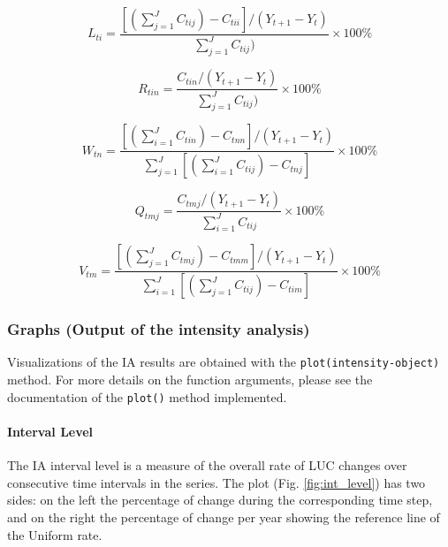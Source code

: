 \begin{equation} \label{eq:lti}
L_{ti} = \frac{\left[\left( \sum_{j=1}^{J} C_{tij} \right) - C_{tii}   \right] / (Y_{t+1} - Y_t)}{\sum_{j=1}^{J} C_{tij})} \times 100\%
\end{equation}

\begin{equation} \label{eq:rtin}
R_{tin} = \frac{C_{tin} / (Y_{t+1} - Y_t)}{\sum_{j=1}^{J} C_{tij})} \times 100\%
\end{equation}

\begin{equation} \label{eq:wtn}
W_{tn} = \frac{\left[\left( \sum_{i=1}^{J} C_{tin} \right) - C_{tnn}   \right] / (Y_{t+1} - Y_t)}{\sum_{j=1}^{J}  \left[\left( \sum_{i=1}^{J} C_{tij} \right) - C_{tnj}   \right]} \times 100\%
\end{equation}

\begin{equation} \label{eq:qtmj}
Q_{tmj} = \frac{C_{tmj} / (Y_{t+1} - Y_t)}{\sum_{i=1}^{J} C_{tij}} \times 100\%
\end{equation}

\begin{equation} \label{eq:vtm}
V_{tm} = \frac{\left[\left( \sum_{j=1}^{J} C_{tmj} \right) - C_{tmm}   \right] / (Y_{t+1} - Y_t)}{\sum_{i=1}^{J}  \left[\left( \sum_{j=1}^{J} C_{tij} \right) - C_{tim}   \right]} \times 100\%
\end{equation}

\hypertarget{graphs-output-of-the-intensity-analysis}{%
\subsubsection{Graphs (Output of the intensity
analysis)}\label{graphs-output-of-the-intensity-analysis}}

Visualizations of the IA results are obtained with the
\texttt{plot(intensity-object)} method. For more details on the function
arguments, please see the documentation of the \texttt{plot()} method
implemented.

\hypertarget{interval-level}{%
\paragraph{Interval Level}\label{interval-level}}

The IA interval level is a measure of the overall rate of LUC changes
over consecutive time intervals in the series. The plot (Fig.
\ref{fig:int_level}) has two sides: on the left the percentage of change
during the corresponding time step, and on the right the percentage of
change per year showing the reference line of the Uniform rate.

